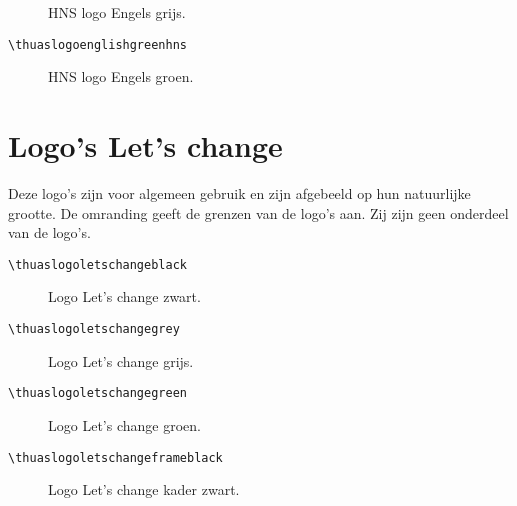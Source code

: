 \documentclass[a4paper,12pt]{article}
\begin{document}
\begin{figure}[H]
\centering\fboxsep=0pt%
\fbox{%
\scalebox{0.7071}{\thuaslogoenglishgreyhns}}
\caption{HNS logo Engels grijs.}
\end{figure}

\begin{verbatim}
\thuaslogoenglishgreenhns
\end{verbatim}

\begin{figure}[H]
\centering\fboxsep=0pt%
\fbox{%
\scalebox{0.7071}{\thuaslogoenglishgreenhns}}
\caption{HNS logo Engels groen.}
\end{figure}


\section{Logo's Let's change}
Deze logo's zijn voor algemeen gebruik en zijn afgebeeld op hun natuurlijke grootte.
De omranding geeft de grenzen van de logo's aan. Zij zijn geen onderdeel
van de logo's.

\begin{verbatim}
\thuaslogoletschangeblack
\end{verbatim}

\begin{figure}[H]
\centering\fboxsep=0pt%
\fbox{%
\thuaslogoletschangeblack}
\caption{Logo Let's change zwart.}
\end{figure}

\begin{verbatim}
\thuaslogoletschangegrey
\end{verbatim}

\begin{figure}[H]
\centering\fboxsep=0pt%
\fbox{%
\thuaslogoletschangegrey}
\caption{Logo Let's change grijs.}
\end{figure}

\begin{verbatim}
\thuaslogoletschangegreen
\end{verbatim}

\begin{figure}[H]
\centering\fboxsep=0pt%
\fbox{%
\thuaslogoletschangegreen}
\caption{Logo Let's change groen.}
\end{figure}

\begin{verbatim}
\thuaslogoletschangeframeblack
\end{verbatim}

\begin{figure}[H]
\centering\fboxsep=0pt%
\fbox{%
\thuaslogoletschangeframeblack}
\caption{Logo Let's change kader zwart.}
\end{figure}
\end{document}
